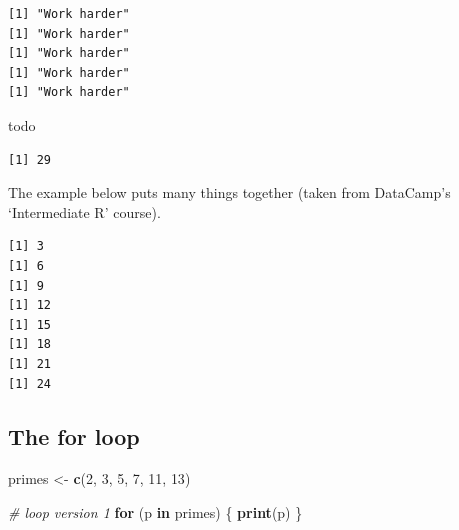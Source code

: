\documentclass[
]{book}
\newenvironment{Shaded}{\begin{snugshade}}{\end{snugshade}}
\newcommand{\CommentTok}[1]{\textcolor[rgb]{0.56,0.35,0.01}{\textit{#1}}}
\newcommand{\ControlFlowTok}[1]{\textcolor[rgb]{0.13,0.29,0.53}{\textbf{#1}}}
\newcommand{\DecValTok}[1]{\textcolor[rgb]{0.00,0.00,0.81}{#1}}
\newcommand{\KeywordTok}[1]{\textcolor[rgb]{0.13,0.29,0.53}{\textbf{#1}}}
\newcommand{\NormalTok}[1]{#1}
\newcommand{\OperatorTok}[1]{\textcolor[rgb]{0.81,0.36,0.00}{\textbf{#1}}}
\newcommand{\StringTok}[1]{\textcolor[rgb]{0.31,0.60,0.02}{#1}}
\begin{document}
\begin{verbatim}
[1] "Work harder"
[1] "Work harder"
[1] "Work harder"
[1] "Work harder"
[1] "Work harder"
\end{verbatim}

\begin{Shaded}
\begin{Highlighting}[]
\NormalTok{todo}
\end{Highlighting}
\end{Shaded}

\begin{verbatim}
[1] 29
\end{verbatim}

The example below puts many things together (taken from DataCamp's `Intermediate R' course).

\begin{Shaded}
\end{Shaded}

\begin{verbatim}
[1] 3
[1] 6
[1] 9
[1] 12
[1] 15
[1] 18
[1] 21
[1] 24
\end{verbatim}

\hypertarget{the-for-loop}{%
\subsection{The for loop}\label{the-for-loop}}

\begin{Shaded}
\begin{Highlighting}[]
\NormalTok{primes <-}\StringTok{ }\KeywordTok{c}\NormalTok{(}\DecValTok{2}\NormalTok{, }\DecValTok{3}\NormalTok{, }\DecValTok{5}\NormalTok{, }\DecValTok{7}\NormalTok{, }\DecValTok{11}\NormalTok{, }\DecValTok{13}\NormalTok{)}

\CommentTok{# loop version 1}
\ControlFlowTok{for}\NormalTok{ (p }\ControlFlowTok{in}\NormalTok{ primes) \{}
  \KeywordTok{print}\NormalTok{(p)}
\NormalTok{\}}
\end{Highlighting}
\end{Shaded}
\end{document}
